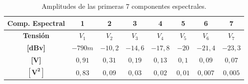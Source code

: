       \begin{table}[H]
        \centering
      \begin{tabular}{cccccccc} \hline \hline
        \textbf{Comp. Espectral}  &  \textbf{1}  &  \textbf{2}  & \textbf{3}  & \textbf{4} & \textbf{5}  & \textbf{6}  &  \textbf{7}\\ \hline
        \textbf{Tensión}   &   $V_1$   &    $V_2$   &   $V_3$  &  $V_4$  &  $V_5$  &  $V_6$  &  $V_7$\\ \hline \hline
        \textbf{[dBv]}   &   $-790m$   &    $-10,2$   &   $-14,6$  &  $-17,8$  &  $-20$  &  $-21,4$  &  $-23,3$\\ \hline
        \textbf{[V]}     &  $0,91$     &    $0,31$    & $0,19$     &  $0,13$   &  $0,1$  &  $0,09$   &  $0,07$ \\ \hline
        $\mathbf{[V^2]}$ &  $0,83$     &    $0,09$    & $0,03$     &  $0,02$   &  $0,01$ &  $0,007$  &  $0,005$ \\ \hline \hline
        \end{tabular}
        \caption{Amplitudes de las primeras 7 componentes espectrales.}
        \label{tab:AmplitudEspectrExp1}
      \end{table}

    \pagebreak
